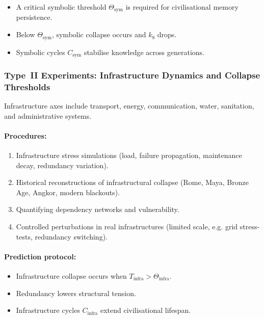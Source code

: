 \begin{itemize}
    \item A critical symbolic threshold $\Theta_{\mathrm{sym}}$ is required
          for civilisational memory persistence.
    \item Below $\Theta_{\mathrm{sym}}$, symbolic collapse occurs and $k_8$ drops.
    \item Symbolic cycles $C_{\mathrm{sym}}$ stabilise knowledge across generations.
\end{itemize}



\subsubsection{Type~II Experiments: Infrastructure Dynamics and Collapse Thresholds}

Infrastructure axes include transport, energy, communication, water,
sanitation, and administrative systems.

\paragraph{Procedures:}

\begin{enumerate}
    \item Infrastructure stress simulations (load, failure propagation,
          maintenance decay, redundancy variation).
    \item Historical reconstructions of infrastructural collapse
          (Rome, Maya, Bronze Age, Angkor, modern blackouts).
    \item Quantifying dependency networks and vulnerability.
    \item Controlled perturbations in real infrastructures (limited scale,
          e.g. grid stress-tests, redundancy switching).
\end{enumerate}

\paragraph{Prediction protocol:}

\begin{itemize}
    \item Infrastructure collapse occurs when
          $T_{\mathrm{infra}} > \Theta_{\mathrm{infra}}$.
    \item Redundancy lowers structural tension.
    \item Infrastructure cycles $C_{\mathrm{infra}}$ extend civilisational lifespan.
\end{itemize}



